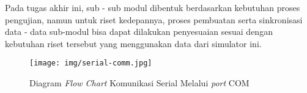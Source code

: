 Pada tugas akhir ini, sub - sub modul dibentuk berdasarkan kebutuhan proses pengujian, namun untuk riset kedepannya, proses pembuatan serta sinkronisasi data - data sub-modul bisa dapat dilakukan penyesuaian sesuai dengan kebutuhan riset tersebut yang menggunakan data dari simulator ini.
    
    
    

\begin{figure}  [!htb]
	        \captionsetup{justification=centering}
	        \texttt{[image: img/serial-comm.jpg]}
	        \caption{Diagram \textit{Flow Chart} Komunikasi Serial Melalui \textit{port} COM}
	        \label{fig: 3_25}
\end{figure}